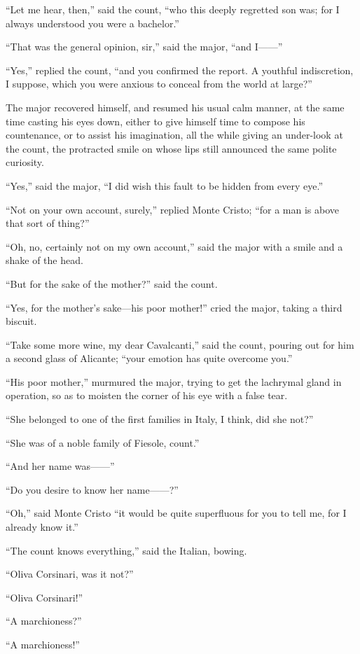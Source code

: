 “Let me hear, then,” said the count, “who this deeply regretted son
was; for I always understood you were a bachelor.”

“That was the general opinion, sir,” said the major, “and I——”

“Yes,” replied the count, “and you confirmed the report. A youthful
indiscretion, I suppose, which you were anxious to conceal from the
world at large?”

The major recovered himself, and resumed his usual calm manner, at the
same time casting his eyes down, either to give himself time to compose
his countenance, or to assist his imagination, all the while giving an
under-look at the count, the protracted smile on whose lips still
announced the same polite curiosity.

“Yes,” said the major, “I did wish this fault to be hidden from every
eye.”

“Not on your own account, surely,” replied Monte Cristo; “for a man is
above that sort of thing?”

“Oh, no, certainly not on my own account,” said the major with a smile
and a shake of the head.

“But for the sake of the mother?” said the count.

“Yes, for the mother’s sake—his poor mother!” cried the major, taking a
third biscuit.

“Take some more wine, my dear Cavalcanti,” said the count, pouring out
for him a second glass of Alicante; “your emotion has quite overcome
you.”

“His poor mother,” murmured the major, trying to get the lachrymal
gland in operation, so as to moisten the corner of his eye with a false
tear.

“She belonged to one of the first families in Italy, I think, did she
not?”

“She was of a noble family of Fiesole, count.”

“And her name was——”

“Do you desire to know her name——?”

“Oh,” said Monte Cristo “it would be quite superfluous for you to tell
me, for I already know it.”

“The count knows everything,” said the Italian, bowing.

“Oliva Corsinari, was it not?”

“Oliva Corsinari!”

“A marchioness?”

“A marchioness!”

